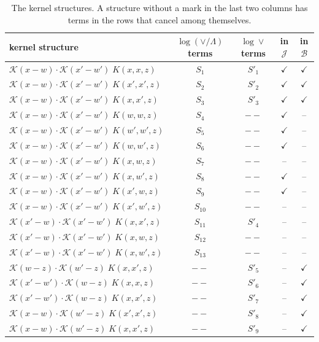 \documentclass[10pt]{article}
\numberwithin{equation}{section}
\newcommand{\KK}{\mathcal K}
\newcommand{\J}{\mathcal J}
\newcommand{\B}{\mathcal B}
\newcommand{\ok}{\textcolor{OliveGreen}{\ensuremath{\checkmark}}}
\begin{document}
\begin{table}[H]
\centering\small
\begin{tabular}{@{}l c c c c@{}}
kernel structure & $\log(\vee/\Lambda)$ terms & $\log\vee$ terms & in $\J$ & in $\B$\\ \hline
$\KK(x-w)\cdot\KK(x'-w')\;K(x,x,z)$ & $S_{1}$ & $S'_{1}$ & \ok & \ok\\
$\KK(x-w)\cdot\KK(x'-w')\;K(x',x',z)$ & $S_{2}$ & $S'_{2}$ & \ok & \ok\\
$\KK(x-w)\cdot\KK(x'-w')\;K(x,x',z)$ & $S_{3}$ & $S'_{3}$ & \ok & \ok\\
$\KK(x-w)\cdot\KK(x'-w')\;K(w,w,z)$ & $S_{4}$ & $--$ & \ok & --\\
$\KK(x-w)\cdot\KK(x'-w')\;K(w',w',z)$ & $S_{5}$ & $--$ & \ok & --\\
$\KK(x-w)\cdot\KK(x'-w')\;K(w,w',z)$ & $S_{6}$ & $--$ & \ok & --\\
$\KK(x-w)\cdot\KK(x'-w')\;K(x,w,z)$ & $S_{7}$ & $--$ & -- & --\\
$\KK(x-w)\cdot\KK(x'-w')\;K(x,w',z)$ & $S_{8}$ & $--$ & \ok & --\\
$\KK(x-w)\cdot\KK(x'-w')\;K(x',w,z)$ & $S_{9}$ & $--$ & \ok & --\\
$\KK(x-w)\cdot\KK(x'-w')\;K(x',w',z)$ & $S_{10}$ & $--$ & -- & --\\
$\KK(x'-w)\cdot\KK(x'-w')\;K(x,x',z)$ & $S_{11}$ & $S'_{4}$ & -- & --\\
$\KK(x'-w)\cdot\KK(x'-w')\;K(x,w,z)$ & $S_{12}$ & $--$ & -- & --\\
$\KK(x'-w)\cdot\KK(x'-w')\;K(x,w',z)$ & $S_{13}$ & $--$ & -- & --\\
$\KK(w-z)\cdot\KK(w'-z)\;K(x,x',z)$ & $--$ & $S'_{5}$ & -- & \ok\\
$\KK(x'-w')\cdot\KK(w-z)\;K(x,x,z)$ & $--$ & $S'_{6}$ & -- & \ok\\
$\KK(x'-w')\cdot\KK(w-z)\;K(x,x',z)$ & $--$ & $S'_{7}$ & -- & \ok\\
$\KK(x-w)\cdot\KK(w'-z)\;K(x',x',z)$ & $--$ & $S'_{8}$ & -- & \ok\\
$\KK(x-w)\cdot\KK(w'-z)\;K(x,x',z)$ & $--$ & $S'_{9}$ & -- & \ok\\
\end{tabular}
\caption{The kernel structures. A structure without a mark in the last two columns has terms in the rows that cancel among themselves.}
\label{tab:structures}
\end{table}
\end{document}
